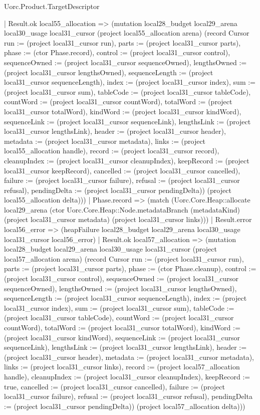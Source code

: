 \begin{lexlean}{Uorc.Product.TargetDescriptor}
\begin{semanticmodule}
{      | Result.ok local55_allocation => (mutation local28_budget local29_arena local30_usage local31_cursor (project local55_allocation arena) (record Cursor {run := (project local31_cursor run), parts := (project local31_cursor parts), phase := (ctor Phase.record), control := (project local31_cursor control), sequenceOwned := (project local31_cursor sequenceOwned), lengthsOwned := (project local31_cursor lengthsOwned), sequenceLength := (project local31_cursor sequenceLength), index := (project local31_cursor index), sum := (project local31_cursor sum), tableCode := (project local31_cursor tableCode), countWord := (project local31_cursor countWord), totalWord := (project local31_cursor totalWord), kindWord := (project local31_cursor kindWord), sequenceLink := (project local31_cursor sequenceLink), lengthsLink := (project local31_cursor lengthsLink), header := (project local31_cursor header), metadata := (project local31_cursor metadata), links := (project local55_allocation handle), record := (project local31_cursor record), cleanupIndex := (project local31_cursor cleanupIndex), keepRecord := (project local31_cursor keepRecord), cancelled := (project local31_cursor cancelled), failure := (project local31_cursor failure), refusal := (project local31_cursor refusal), pendingDelta := (project local31_cursor pendingDelta)}) (project local55_allocation delta)))
    | Phase.record => (match (Uorc.Core.Heap::allocate local29_arena (ctor Uorc.Core.Heap::Node.metadataBranch (metadataKind) (project local31_cursor metadata) (project local31_cursor links)))
      | Result.error local56_error => (heapFailure local28_budget local29_arena local30_usage local31_cursor local56_error)
      | Result.ok local57_allocation => (mutation local28_budget local29_arena local30_usage local31_cursor (project local57_allocation arena) (record Cursor {run := (project local31_cursor run), parts := (project local31_cursor parts), phase := (ctor Phase.cleanup), control := (project local31_cursor control), sequenceOwned := (project local31_cursor sequenceOwned), lengthsOwned := (project local31_cursor lengthsOwned), sequenceLength := (project local31_cursor sequenceLength), index := (project local31_cursor index), sum := (project local31_cursor sum), tableCode := (project local31_cursor tableCode), countWord := (project local31_cursor countWord), totalWord := (project local31_cursor totalWord), kindWord := (project local31_cursor kindWord), sequenceLink := (project local31_cursor sequenceLink), lengthsLink := (project local31_cursor lengthsLink), header := (project local31_cursor header), metadata := (project local31_cursor metadata), links := (project local31_cursor links), record := (project local57_allocation handle), cleanupIndex := (project local31_cursor cleanupIndex), keepRecord := true, cancelled := (project local31_cursor cancelled), failure := (project local31_cursor failure), refusal := (project local31_cursor refusal), pendingDelta := (project local31_cursor pendingDelta)}) (project local57_allocation delta)))
}
\end{semanticmodule}
\end{lexlean}

